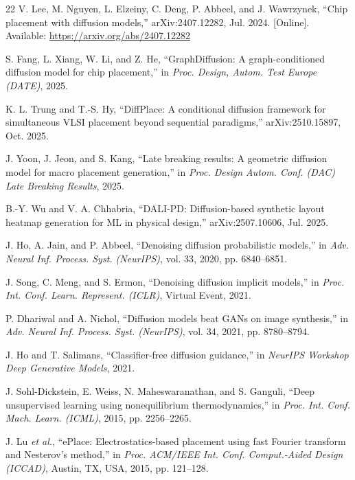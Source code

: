 \documentclass[lettersize,journal]{IEEEtran}
\begin{document}
\begin{thebibliography}{22}
V. Lee, M. Nguyen, L. Elzeiny, C. Deng, P. Abbeel, and J. Wawrzynek, ``Chip placement with diffusion models,'' arXiv:2407.12282, Jul. 2024. [Online]. Available: \url{https://arxiv.org/abs/2407.12282}

S. Fang, L. Xiang, W. Li, and Z. He, ``GraphDiffusion: A graph-conditioned diffusion model for chip placement,'' in \emph{Proc. Design, Autom. Test Europe (DATE)}, 2025.

K. L. Trung and T.-S. Hy, ``DiffPlace: A conditional diffusion framework for simultaneous VLSI placement beyond sequential paradigms,'' arXiv:2510.15897, Oct. 2025.

J. Yoon, J. Jeon, and S. Kang, ``Late breaking results: A geometric diffusion model for macro placement generation,'' in \emph{Proc. Design Autom. Conf. (DAC) Late Breaking Results}, 2025.

B.-Y. Wu and V. A. Chhabria, ``DALI-PD: Diffusion-based synthetic layout heatmap generation for ML in physical design,'' arXiv:2507.10606, Jul. 2025.

J. Ho, A. Jain, and P. Abbeel, ``Denoising diffusion probabilistic models,'' in \emph{Adv. Neural Inf. Process. Syst. (NeurIPS)}, vol. 33, 2020, pp. 6840--6851.

J. Song, C. Meng, and S. Ermon, ``Denoising diffusion implicit models,'' in \emph{Proc. Int. Conf. Learn. Represent. (ICLR)}, Virtual Event, 2021.

P. Dhariwal and A. Nichol, ``Diffusion models beat GANs on image synthesis,'' in \emph{Adv. Neural Inf. Process. Syst. (NeurIPS)}, vol. 34, 2021, pp. 8780--8794.

J. Ho and T. Salimans, ``Classifier-free diffusion guidance,'' in \emph{NeurIPS Workshop Deep Generative Models}, 2021.

J. Sohl-Dickstein, E. Weiss, N. Maheswaranathan, and S. Ganguli, ``Deep unsupervised learning using nonequilibrium thermodynamics,'' in \emph{Proc. Int. Conf. Mach. Learn. (ICML)}, 2015, pp. 2256--2265.

J. Lu \emph{et al.}, ``ePlace: Electrostatics-based placement using fast Fourier transform and Nesterov's method,'' in \emph{Proc. ACM/IEEE Int. Conf. Comput.-Aided Design (ICCAD)}, Austin, TX, USA, 2015, pp. 121--128.


\end{thebibliography}
\end{document}
